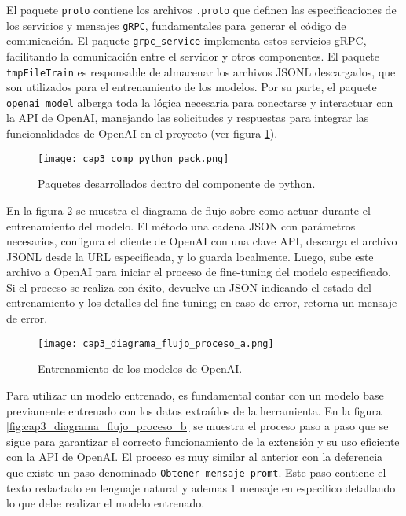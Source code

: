 \begin{itemize}
	El paquete \texttt{proto} contiene los archivos \texttt{.proto} que definen las especificaciones de los servicios y mensajes \texttt{gRPC}, fundamentales para generar el código de comunicación. El paquete \texttt{grpc\_service} implementa estos servicios gRPC, facilitando la comunicación entre el servidor y otros componentes. El paquete \texttt{tmpFileTrain} es responsable de almacenar los archivos JSONL descargados, que son utilizados para el entrenamiento de los modelos. Por su parte, el paquete \texttt{openai\_model} alberga toda la lógica necesaria para conectarse y interactuar con la API de OpenAI, manejando las solicitudes y respuestas para integrar las funcionalidades de OpenAI en el proyecto (ver figura \ref{fig:cap3_comp_python_pack}).	
	
	\begin{figure}[H]  
		\centering
		\texttt{[image: cap3\_comp\_python\_pack.png]}
		\caption{Paquetes desarrollados dentro del componente de python.}
		\label{fig:cap3_comp_python_pack}
	\end{figure}
	
	En la figura \ref{fig:cap3_diagrama_flujo_proceso_a} se muestra el diagrama de flujo sobre como actuar durante el entrenamiento del modelo. El método una cadena JSON con parámetros necesarios, configura el cliente de OpenAI con una clave API, descarga el archivo JSONL desde la URL especificada, y lo guarda localmente. Luego, sube este archivo a OpenAI para iniciar el proceso de fine-tuning del modelo especificado. Si el proceso se realiza con éxito, devuelve un JSON indicando el estado del entrenamiento y los detalles del fine-tuning; en caso de error, retorna un mensaje de error.

	
	\begin{figure}[H]  
		\centering
		\texttt{[image: cap3\_diagrama\_flujo\_proceso\_a.png]}
		\caption{Entrenamiento de los modelos de OpenAI.}
		\label{fig:cap3_diagrama_flujo_proceso_a}
	\end{figure}
	
	Para utilizar un modelo entrenado, es fundamental contar con un modelo base previamente entrenado con los datos extraídos de la herramienta. En la figura \ref{fig:cap3_diagrama_flujo_proceso_b} se muestra el proceso paso a paso que se sigue para garantizar el correcto funcionamiento de la extensión y su uso eficiente con la API de OpenAI. El proceso es muy similar al anterior con la deferencia que existe un paso denominado \texttt{Obtener mensaje promt}. Este paso contiene el texto redactado en lenguaje natural y ademas 1 mensaje en especifico detallando lo que debe realizar el modelo entrenado. 
	

\end{itemize}
